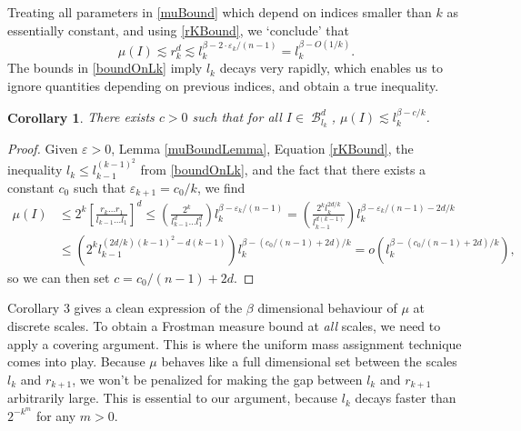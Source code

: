 \documentclass[dvipsnames,letterpaper,12pt]{article}
\numberwithin{equation}{section}
\theoremstyle{plain}
\newtheorem{corollary}{Corollary}
\theoremstyle{remark}
\DeclareMathOperator{\B}{\mathcal{B}}
\begin{document}
Treating all parameters in \eqref{muBound} which depend on indices smaller than $k$ as essentially constant, and using \eqref{rKBound}, we `conclude' that
%
\[ \mu(I) \lesssim r_k^d \lesssim l_k^{\beta - 2 \cdot \varepsilon_k / (n-1)} = l_k^{\beta - O(1/k)}. \]
%
The bounds in \eqref{boundOnLk} imply $l_k$ decays very rapidly, which enables us to ignore quantities depending on previous indices, and obtain a true inequality.

\begin{corollary}
	There exists $c > 0$ such that for all $I \in \B^d_{l_k}$, $\mu(I) \lesssim l_k^{\beta - c/k}$.
\end{corollary}
\begin{proof}
	Given $\varepsilon > 0$, Lemma \ref{muBoundLemma}, Equation \eqref{rKBound}, the inequality $l_k \leq l_{k-1}^{(k-1)^2}$ from \eqref{boundOnLk}, and the fact that there exists a constant $c_0$ such that $\varepsilon_{k+1} = c_0/k$, we find
	\begin{align*}
		\mu(I) &\leq 2^k \left[ \frac{r_k \dots r_1}{l_{k-1} \dots l_1} \right]^d \leq \left( \frac{2^k}{l_{k-1}^d \dots l_1^d} \right) l_k^{\beta - \varepsilon_k / (n-1)} = \left( \frac{2^k l_k^{2d/k}}{l_{k-1}^{d(k-1)}} \right) l_k^{\beta - \varepsilon_k/(n-1) - 2d/k}\\
		&\leq \left( 2^k l_{k-1}^{(2d/k)(k-1)^2 - d(k-1)} \right) l_k^{\beta - (c_0/(n-1) + 2d)/k} = o \left(l_k^{\beta - (c_0/(n-1) + 2d)/k} \right), %
	\end{align*}
	so we can then set $c = c_0/(n-1) + 2d$.
\end{proof}

Corollary 3 gives a clean expression of the $\beta$ dimensional behaviour of $\mu$ at discrete scales. To obtain a Frostman measure bound at {\it all} scales, we need to apply a covering argument. This is where the uniform mass assignment technique comes into play. Because $\mu$ behaves like a full dimensional set between the scales $l_k$ and $r_{k+1}$, we won't be penalized for making the gap between $l_k$ and $r_{k+1}$ arbitrarily large. This is essential to our argument, because $l_k$ decays faster than $2^{-k^m}$ for any $m > 0$.
\end{document}
